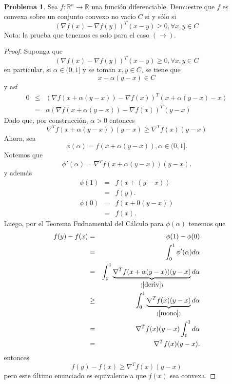\documentclass[12pt,letterpaper]{article}
\theoremstyle{definition}
\newtheorem{problm}{Problema}
\begin{document}
\begin{problm}
	Sea $ f : \mathbb{R}^n \to \mathbb{R} $ una función diferenciable. Demuestre que $ f $ es convexa sobre un conjunto convexo no vacío $ C $ si y sólo si
	\[ (\nabla f(x) - \nabla f(y))^T (x - y) \geq 0, \forall x, y \in C \]
	Nota: la prueba que tenemos es solo para el caso $ (\to )$.
	\begin{proof}
		Suponga que 
		\[ (\nabla f(x) - \nabla f(y))^T (x - y) \geq 0, \forall x, y \in C \]
		en particular, si $ \alpha\in(0,1] $ y se toman $ x,y\in C $, se tiene que 
		\[x + \alpha (y-x) \in C\] 
		y así
		\begin{eqnarray*}
			0 & \leq & (\nabla f(x + \alpha (y - x)) - \nabla f(x))^T (x + \alpha (y - x) - x) \\
			  &   =  & \alpha (\nabla f(x + \alpha (y - x)) - \nabla f(x))^T (y - x) 
		\end{eqnarray*}
		Dado que, por construcción, $ \alpha > 0 $ entonces
		\begin{equation}\label{mono}
			\nabla^T f(x + \alpha (y - x))(y - x) \geq \nabla^T f(x) (y-x) 
		\end{equation}
		Ahora, sea
		\[ \phi (\alpha) = f (x + \alpha (y - x)), \alpha\in(0,1]. \]
		Notemos que
		\begin{equation} \label{deriv}
			\phi ' (\alpha) = \nabla^T f(x + \alpha (y - x)) (y-x).
		\end{equation}
		y además
		\begin{eqnarray*}
			\phi (1) & = & f( x + (y-x)) \\
					 & = & f(y). \\
			\phi (0) & = & f(x + 0(y-x)) \\
			         & = & f(x).
		\end{eqnarray*}
		Luego, por el Teorema Fudnamental del Cálculo para $ \phi(\alpha) $ tenemos que
		\begin{eqnarray*}
			f(y) - f(x) & = & \phi ( 1 ) - \phi (0) \\
			            & = & \int_{0}^{1} \phi ' (\alpha) d \alpha \\
			            & = & \int_{0}^{1} \underbrace{\nabla^T f(x + \alpha (y - x)) (y-x)}_{(\ref{deriv})} d \alpha \\ 
			            & \geq & \int_{0}^{1} \underbrace{\nabla^T f(x) (y-x)}_{(\ref{mono})} d \alpha \\ 
			            & = & \nabla^T f(x) (y-x) \int_{0}^{1} d \alpha \\ 
			            & = & \nabla^T f(x) (y-x). 
		\end{eqnarray*}
		entonces
		\[ f(y) - f(x) \geq \nabla^T f(x) (y-x) \]
		pero este último enunciado es equivalente a que $ f(x) $ sea convexa.
	\end{proof}
\end{problm}
\end{document}

